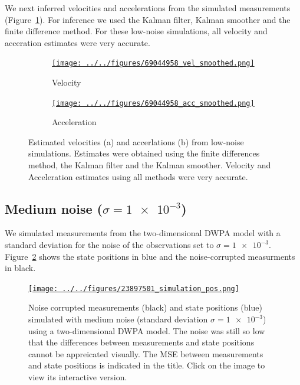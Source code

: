 \documentclass[12pt]{article}
\begin{document}
We next inferred velocities and accelerations from the simulated measurements
(Figure~\ref{fig:vel_acc_low_noise}). For inference we used the Kalman filter,
Kalman smoother and the finite difference method. For these low-noise
simulations, all velocity and acceration estimates were very accurate.

\begin{figure}

    \begin{subfigure}{\textwidth}
        \centering
        \href{http://www.gatsby.ucl.ac.uk/~rapela/fwg/lds_repo/inference/figures/69044958_vel_smoothed.html}{\texttt{[image: ../../figures/69044958\_vel\_smoothed.png]}}
        \caption{Velocity}
    \end{subfigure}

    \begin{subfigure}{\textwidth}
        \centering
        \href{http://www.gatsby.ucl.ac.uk/~rapela/fwg/lds_repo/inference/figures/69044958_acc_smoothed.html}{\texttt{[image: ../../figures/69044958\_acc\_smoothed.png]}}
        \caption{Acceleration}
    \end{subfigure}

    \caption{Estimated velocities (a) and accerlations (b) from low-noise
    simulations.  Estimates were obtained using the finite differences method,
    the Kalman filter and the Kalman smoother. Velocity and Acceleration
    estimates using all methods were very accurate.}

    \label{fig:vel_acc_low_noise}

\end{figure}

\subsection{Medium noise ($\sigma=\num{1e-3}$)}

We simulated measurements from the two-dimensional DWPA model with a standard
deviation for the noise of the observations set to $\sigma=\num{1e-3}$.
Figure~\ref{fig:simulations_medium_noise} shows the state positions in blue and
the noise-corrupted measurments in black.

\begin{figure}

    \centering
    \href{http://www.gatsby.ucl.ac.uk/~rapela/fwg/lds_repo/inference/figures/23897501_simulation_pos.html}{\texttt{[image: ../../figures/23897501\_simulation\_pos.png]}}

    \caption{Noise corrupted measurements (black) and state positions (blue)
    simulated with medium noise (standard deviation $\sigma=\num{1e-3}$) using
    a two-dimensional DWPA model.  The noise was still so low that the
    differences between measurements and state positions cannot be appreicated
    visually.  The MSE between measurements and state positions is indicated in
    the title. Click on the image to view its interactive version.}

    \label{fig:simulations_medium_noise}

\end{figure}
\end{document}
